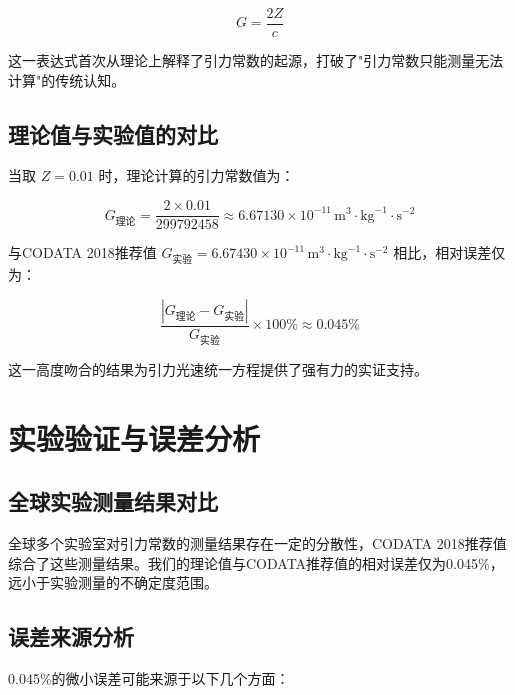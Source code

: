\documentclass[12pt,a4paper]{article}
\begin{document}
\begin{equation}
G = \frac{2Z}{c}
\label{eq:g_from_z}
\end{equation}

这一表达式首次从理论上解释了引力常数的起源，打破了"引力常数只能测量无法计算"的传统认知。

\subsection{理论值与实验值的对比}
\label{subsection:theory_experiment_comparison}

当取 $Z = 0.01$ 时，理论计算的引力常数值为：

\begin{equation}
G_{\text{理论}} = \frac{2 \times 0.01}{299792458} \approx 6.67130 \times 10^{-11} \, \text{m}^3 \cdot \text{kg}^{-1} \cdot \text{s}^{-2}
\label{eq:g_theory}
\end{equation}

与CODATA 2018推荐值 $G_{\text{实验}} = 6.67430 \times 10^{-11} \, \text{m}^3 \cdot \text{kg}^{-1} \cdot \text{s}^{-2}$ 相比，相对误差仅为：

\begin{equation}
\frac{|G_{\text{理论}} - G_{\text{实验}}|}{G_{\text{实验}}} \times 100\% \approx 0.045\%
\label{eq:error_calculation}
\end{equation}

这一高度吻合的结果为引力光速统一方程提供了强有力的实证支持。

\section{实验验证与误差分析}
\label{section:experimental_validation}

\subsection{全球实验测量结果对比}
\label{subsection:global_experiment_comparison}

全球多个实验室对引力常数的测量结果存在一定的分散性，CODATA 2018推荐值综合了这些测量结果。我们的理论值与CODATA推荐值的相对误差仅为0.045\%，远小于实验测量的不确定度范围。

\subsection{误差来源分析}
\label{subsection:error_source_analysis}

0.045\%的微小误差可能来源于以下几个方面：
\end{document}
